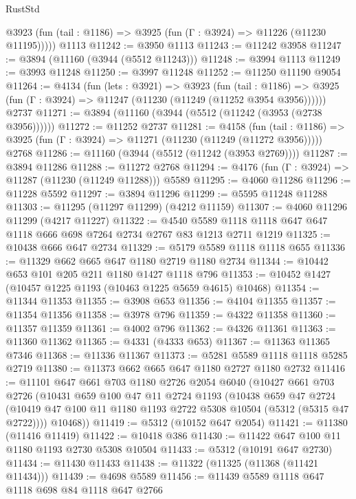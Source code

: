 \begin{lexlean}{RustStd}
\begin{coremodule}
      @3923 (fun (tail : @1186) => @3925 (fun (Γ : @3924) => @11226 (@11230 @11195)))))
    @1113
@11242 := @3950 @1113
@11243 := @11242 @3958
@11247 := @3894 (@11160 (@3944 (@5512 @11243)))
@11248 := @3994 @1113
@11249 := @3993 @11248
@11250 := @3997 @11248
@11252 := @11250 @11190 @9054
@11264 := @4134
    (fun (lets : @3921) =>
    @3923
      (fun (tail : @1186) =>
      @3925 (fun (Γ : @3924) => @11247 (@11230 (@11249 (@11252 @3954 @3956))))))
    @2737
@11271 := @3894 (@11160 (@3944 (@5512 (@11242 (@3953 (@2738 @3956))))))
@11272 := @11252 @2737
@11281 := @4158
    (fun (tail : @1186) => @3925 (fun (Γ : @3924) => @11271 (@11230 (@11249 (@11272 @3956)))))
    @2768
@11286 := @11160 (@3944 (@5512 (@11242 (@3953 @2769))))
@11287 := @3894 @11286
@11288 := @11272 @2768
@11294 := @4176 (fun (Γ : @3924) => @11287 (@11230 (@11249 @11288))) @5589
@11295 := @4060 @11286
@11296 := @11228 @5592
@11297 := @3894 @11296
@11299 := @5595 @11248 @11288
@11303 := @11295 (@11297 @11299) (@4212 @11159)
@11307 := @4060 @11296 @11299 (@4217 @11227)
@11322 := @4540 @5589 @1118 @1118 @647 @647 @1118 @666 @698 @7264 @2734 @2767 @83 @1213 @2711 @1219
@11325 := @10438 @666 @647 @2734
@11329 := @5179 @5589 @1118 @1118 @655
@11336 := @11329 @662 @665 @647 @1180 @2719 @1180 @2734
@11344 := @10442 @653 @101 @205 @211 @1180 @1427 @1118 @796
@11353 := @10452 @1427 (@10457 @1225 @1193 (@10463 @1225 @5659 @4615) @10468)
@11354 := @11344 @11353
@11355 := @3908 @653
@11356 := @4104 @11355
@11357 := @11354 @11356
@11358 := @3978 @796
@11359 := @4322 @11358
@11360 := @11357 @11359
@11361 := @4002 @796
@11362 := @4326 @11361
@11363 := @11360 @11362
@11365 := @4331 (@4333 @653)
@11367 := @11363 @11365 @7346
@11368 := @11336 @11367
@11373 := @5281 @5589 @1118 @1118 @5285 @2719
@11380 := @11373 @662 @665 @647 @1180 @2727 @1180 @2732
@11416 := @11101
    @647
    @661
    @703
    @1180
    @2726
    @2054
    @6040
    (@10427
      @661
      @703
      @2726
      (@10431
        @659
        @100
        @47
        @11
        @2724
        @1193
        (@10438
          @659
          @47
          @2724
          (@10419 @47 @100 @11 @1180 @1193 @2722 @5308 @10504 (@5312 (@5315 @47 @2722))))
        @10468))
@11419 := @5312 (@10152 @647 @2054)
@11421 := @11380 (@11416 @11419)
@11422 := @10418 @386
@11430 := @11422 @647 @100 @11 @1180 @1193 @2730 @5308 @10504
@11433 := @5312 (@10191 @647 @2730)
@11434 := @11430 @11433
@11438 := @11322 (@11325 (@11368 (@11421 @11434)))
@11439 := @4698 @5589
@11456 := @11439
    @5589
    @1118
    @647
    @1118
    @698
    @84
    @1118
    @647
    @2766

\end{coremodule}
\end{lexlean}
